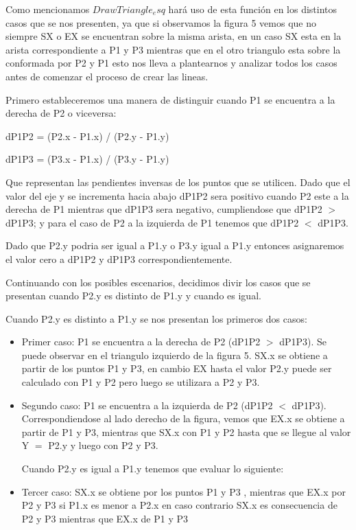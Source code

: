 \documentclass[a4paper]{article}
\begin{document}
Como mencionamos $DrawTriangle_esq$ hará uso de esta función en los distintos casos que se nos presenten, ya que si observamos la figura 5 vemos que no siempre SX o EX se encuentran sobre la misma arista, en un caso SX esta en la arista correspondiente a P1 y P3 mientras que en el otro triangulo esta sobre la conformada por P2 y P1 esto nos lleva a plantearnos y analizar todos los casos antes de comenzar el proceso de crear las lineas.


Primero estableceremos una manera de distinguir cuando P1 se encuentra a la derecha de P2 o viceversa: 

dP1P2 = (P2.x - P1.x) / (P2.y - P1.y) 

dP1P3 = (P3.x - P1.x) / (P3.y - P1.y)


Que representan las pendientes inversas de los puntos que se utilicen. Dado que el valor del eje y se incrementa hacia abajo dP1P2 sera positivo cuando P2 este a la derecha de P1 mientras que dP1P3 sera negativo, cumpliendose que dP1P2 $>$ dP1P3; y para el caso de P2 a la izquierda de P1 tenemos que dP1P2 $<$ dP1P3. \par Dado que P2.y podria ser igual a P1.y o P3.y igual a P1.y entonces asignaremos el valor cero a dP1P2 y dP1P3 correspondientemente.



Continuando con los posibles escenarios, decidimos divir los casos que se presentan cuando P2.y es distinto de P1.y y cuando es igual.\newline
\par Cuando P2.y es distinto a P1.y se nos presentan los primeros dos casos:
 
\begin{itemize}
\item Primer caso: P1 se encuentra a la derecha de P2 (dP1P2 $>$ dP1P3). Se puede observar en el triangulo izquierdo de la figura 5. SX.x se obtiene a partir de los puntos P1 y P3, en cambio EX hasta el valor P2.y puede ser calculado con P1 y P2 pero luego se utilizara a P2 y P3.

\item Segundo caso: P1 se encuentra a la izquierda de P2 (dP1P2 $<$ dP1P3). Correspondiendose al lado derecho de la figura, vemos que EX.x se obtiene a partir de P1 y P3, mientras que SX.x con P1 y P2 hasta que se llegue al valor Y $=$ P2.y y luego con P2 y P3. 

Cuando P2.y es igual a P1.y tenemos que evaluar lo siguiente:

\item Tercer caso:  SX.x se obtiene por los puntos P1 y P3 , mientras que EX.x por P2 y P3 si P1.x es menor a P2.x en caso contrario SX.x es consecuencia de P2 y P3 mientras que EX.x de P1 y P3 


\end{itemize}
\end{document}
